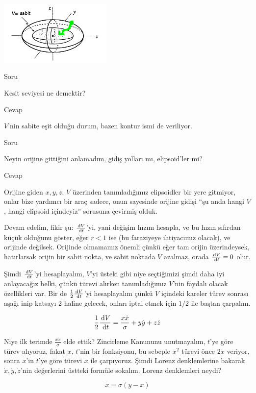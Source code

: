 \documentclass[12pt,fleqn]{article}\usepackage{../../common}
\begin{document}
\includegraphics[width=15em]{17_03.png}

Soru 

Kesit seviyesi ne demektir? 

Cevap

$V$'nin sabite eşit olduğu durum, bazen kontur ismi de veriliyor. 

Soru

Neyin orijine gittiğini anlamadım, gidiş yolları mı, elipsoid'ler mi?

Cevap

Orijine giden $x,y,z$. $V$ üzerinden tanımladığımız elipsoidler bir yere
gitmiyor, onlar bize yardımcı bir araç sadece, onun sayesinde orijine
gidişi ``şu anda hangi $V$, hangi elipsoid içindeyiz'' sorusuna çevirmiş
olduk.

Devam edelim, fikir şu: $\frac{\,\mathrm{d} V}{\,\mathrm{d} t}$'yi, yani değişim hızını
hesapla, ve bu hızın sıfırdan küçük olduğunu göster, eğer $r < 1$ ise (bu
faraziyeye ihtiyacımız olacak), ve orijinde değilsek. Orijinde olmamamız
önemli çünkü eğer tam orijin üzerindeysek, hatırlarsak orijin bir sabit
nokta, ve sabit noktada $V$ azalmaz, orada $\frac{\,\mathrm{d} V}{\,\mathrm{d} t}=0$
olur.  

Şimdi $\frac{\,\mathrm{d} V}{\,\mathrm{d} t}$'yi hesaplayalım, $V$'yi üsteki gibi niye
seçtiğimizi şimdi daha iyi anlayacağız belki, çünkü türevi alırken
tanımladığımız $V$'nin faydalı olacak özellikleri var. Bir de
$\frac{1}{2} \frac{\,\mathrm{d} V}{\,\mathrm{d} t}$'yi hesaplayalım çünkü $V$ içindeki
kareler türev sonrası aşağı inip katsayı 2 haline gelecek, onları iptal
etmek için $1/2$ ile baştan çarpalım.

$$ 
\frac{1}{2} \frac{\,\mathrm{d} V}{\,\mathrm{d} t} = 
\frac{x\dot{x}}{\sigma} + y\dot{y} + z\dot{z} 
$$

Niye ilk terimde $\frac{x\dot{x}}{\sigma}$ elde ettik? Zincirleme Kanununu
unutmayalım, $t$'ye göre türev alıyoruz, fakat $x$, $t$'nin bir fonksiyonu,
bu sebeple $x^2$ türevi önce $2x$ veriyor, sonra $x$'in $t$'ye göre türevi
$\dot{x}$ ile çarpıyoruz. Şimdi Lorenz denklemlerine bakarak
$\dot{x},\dot{y},\dot{z}$'nin değerlerini üstteki formüle sokalım. Lorenz
denklemleri neydi?

$$ \dot{x} = \sigma (y - x)$$
\end{document}

